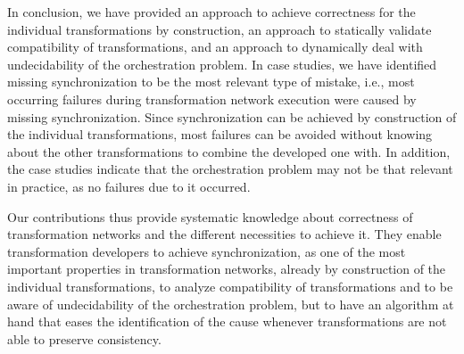 In conclusion, we have provided an approach to achieve correctness for the individual transformations by construction, an approach to statically validate compatibility of transformations, and an approach to dynamically deal with undecidability of the orchestration problem.
In case studies, we have identified missing synchronization to be the most relevant type of mistake, i.e., most occurring failures during transformation network execution were caused by missing synchronization.
Since synchronization can be achieved by construction of the individual transformations, most failures can be avoided without knowing about the other transformations to combine the developed one with.
In addition, the case studies indicate that the orchestration problem may not be that relevant in practice, as no failures due to it occurred.

Our contributions thus provide systematic knowledge about correctness of transformation networks and the different necessities to achieve it.
They enable transformation developers to achieve synchronization, as one of the most important properties in transformation networks, already by construction of the individual transformations, to analyze compatibility of transformations and to be aware of undecidability of the orchestration problem, but to have an algorithm at hand that eases the identification of the cause whenever transformations are not able to preserve consistency.

